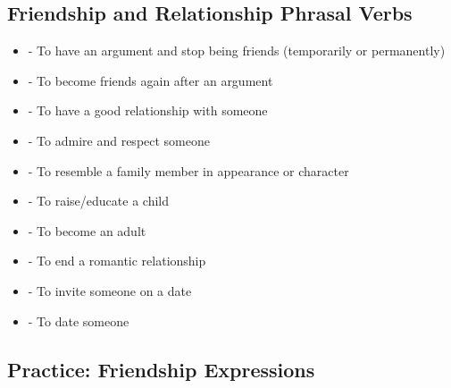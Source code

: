 \subsection{Friendship and Relationship Phrasal Verbs}

\begin{vocabbox}[title=Common Phrasal Verbs for Relationships]
\begin{itemize}
    \item {} - To have an argument and stop being friends (temporarily or permanently)
    \item {} - To become friends again after an argument
    \item {} - To have a good relationship with someone
    \item {} - To admire and respect someone
    \item {} - To resemble a family member in appearance or character
    \item {} - To raise/educate a child
    \item {} - To become an adult
    \item {} - To end a romantic relationship
    \item {} - To invite someone on a date
    \item {} - To date someone
\end{itemize}
\end{vocabbox}

\subsection{Practice: Friendship Expressions}

